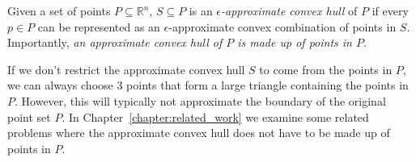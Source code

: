 \begin{definition}
Given a set of points $P \subseteq \mathbb{R}^n$, $S \subseteq P$ is an \emph{$\epsilon$-approximate convex hull} of $P$ if every $p \in P$ can be represented as an $\epsilon$-approximate convex combination of points in $S$. Importantly, \emph{an approximate convex hull of $P$ is made up of points in $P$}.
\end{definition}

If we don't restrict the approximate convex hull $S$ to come from the points in $P$, we can always choose 3 points that form a large triangle containing the points in $P$. However, this will typically not approximate the boundary of the original point set $P$. In Chapter~\ref{chapter:related_work} we examine some related problems where the approximate convex hull does not have to be made up of points in $P$.

